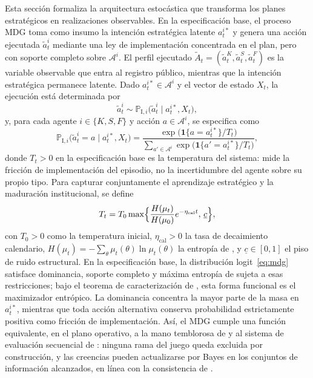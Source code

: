 \documentclass[pdflatex,sn-mathphys-ay]{sn-jnl}
\theoremstyle{thmstyleone}
\theoremstyle{thmstyletwo}
\theoremstyle{thmstylethree}
\newcommand{\1}{\mathbf{1}}
\newcommand{\ProbI}[1]{\mathbb{P}_{\mathrm{I},#1}}
\begin{document}
Esta sección formaliza la arquitectura estocástica que transforma los planes estratégicos en realizaciones observables. En la especificación base, el proceso MDG toma como insumo la intención estratégica latente $a_t^{i\ast}$ y genera una acción ejecutada $\tilde{a}_t^i$ mediante una ley de implementación concentrada en el plan, pero con soporte completo sobre $\mathcal{A}^i$. El perfil ejecutado $\tilde{A}_t=(\tilde{a}_t^K,\tilde{a}_t^S,\tilde{a}_t^F)$ es la variable observable que entra al registro público, mientras que la intención estratégica permanece latente. Dado $a_t^{i\ast}\in\mathcal{A}^i$ y el vector de estado $X_t$, la ejecución está determinada por
\[
\tilde{a}_t^i\sim\ProbI{i}\bigl(\tilde{a}_t^i\mid a_t^{i\ast},X_t\bigr),
\]
y, para cada agente $i\in\{K,S,F\}$ y acción $a\in\mathcal{A}^i$, se especifica como
\begin{equation}
\ProbI{i}\bigl(\tilde{a}_t^i=a\mid a_t^{i\ast},X_t\bigr)
=\frac{\exp\bigl(\mathbf{1}\{a=a_t^{i\ast}\}/T_t\bigr)}{\sum_{a'\in\mathcal{A}^i}\exp\bigl(\mathbf{1}\{a'=a_t^{i\ast}\}/T_t\bigr)},
\label{eq:mdg}
\end{equation}
donde $T_t>0$ en la especificación base es la temperatura del sistema: mide la fricción de implementación del episodio, no la incertidumbre del agente sobre su propio tipo. Para capturar conjuntamente el aprendizaje estratégico y la maduración institucional, se define
\begin{equation}
T_t=T_0\max\Bigl\{\frac{H(\mu_t)}{H(\mu_0)}e^{-\eta_{\mathrm{cal}}t},\,\underline{c}\Bigr\},
\label{eq:temperature}
\end{equation}
con $T_0>0$ como la temperatura inicial, $\eta_{\mathrm{cal}}>0$ la tasa de decaimiento calendario, $H(\mu_t)=-\sum_\theta\mu_t(\theta)\ln\mu_t(\theta)$ la entropía de \citet{Shannon1948}, y $\underline{c}\in[0,1]$ el piso de ruido estructural. En la especificación base, la distribución logit~\eqref{eq:mdg} satisface dominancia, soporte completo y máxima entropía de \citet{Shannon1948} sujeta a esas restricciones; bajo el teorema de caracterización de \citet{Jaynes1957Information}, esta forma funcional es el maximizador entrópico. La dominancia concentra la mayor parte de la masa en $a_t^{i\ast}$, mientras que toda acción alternativa conserva probabilidad estrictamente positiva como fricción de implementación. Así, el MDG cumple una función equivalente, en el plano operativo, a la mano temblorosa de \citet{Selten1975Perfectness} y al sistema de evaluación secuencial de \citet{KrepsWilson1982}: ninguna rama del juego queda excluida por construcción, y las creencias pueden actualizarse por Bayes en los conjuntos de información alcanzados, en línea con la consistencia de \citet{FudenbergTirole1991PBE}.
\end{document}
